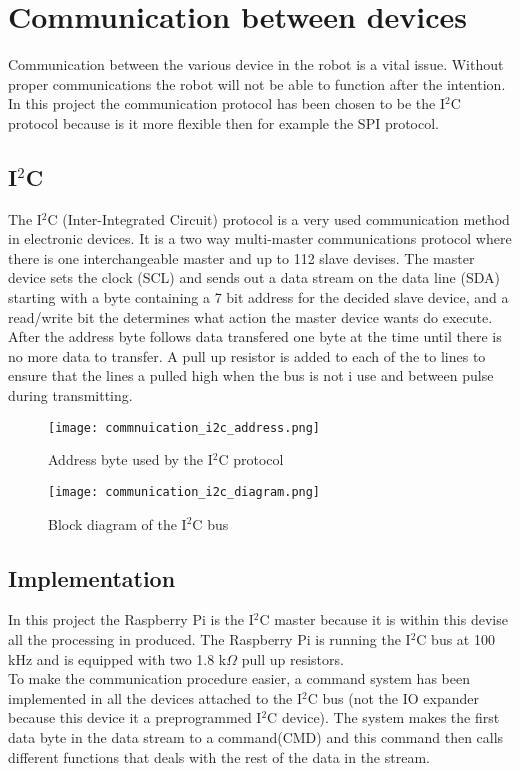 \chapter{Communication between devices}
\label{ch_communication}
Communication between the various device in the robot is a vital issue. Without proper communications the robot will not be able to function after the intention. In this project the communication protocol has been chosen to be the I$^2$C protocol because is it more flexible then for example the SPI protocol.    
\section{I$^2$C}
The I$^2$C (Inter-Integrated Circuit) protocol is a very used communication method in electronic devices. It is a two way multi-master communications protocol where there is one interchangeable master and up to 112 slave devises. The master device sets the clock (SCL) and sends out a data stream on the data line (SDA) starting with a byte containing a 7 bit address for the decided slave device, and a read/write bit the determines what action the master device wants do execute. After the address byte follows data transfered one byte at the time until there is no more data to transfer. A pull up resistor is added to each of the to lines to ensure that the lines a pulled high when the bus is not i use and between pulse during transmitting.

\begin{figure}[!h]
	\centering
	\texttt{[image: commnuication\_i2c\_address.png]}
	\caption{Address byte used by the I$^2$C protocol}
	\label{fig:communication_I2C_address}
\end{figure}


\begin{figure}[!h]
	\centering
	\texttt{[image: communication\_i2c\_diagram.png]}
	\caption{Block diagram of the I$^2$C bus}
	\label{fig:communication_I2C_diagram}
\end{figure}
\newpage
\section{Implementation}
In this project the Raspberry Pi is the I$^2$C master because it is within this devise all the processing in produced. The Raspberry Pi is running the I$^2$C bus at 100 kHz and is equipped with two 1.8 k$\Omega$ pull up resistors.\\ To make the communication procedure easier, a command system has been implemented in all the devices attached to the I$^2$C bus (not the IO expander because this device it a preprogrammed I$^2$C device). The system makes the first data byte in the data stream to a command(CMD) and this command then calls different functions that deals with the rest of the data in the stream.   



